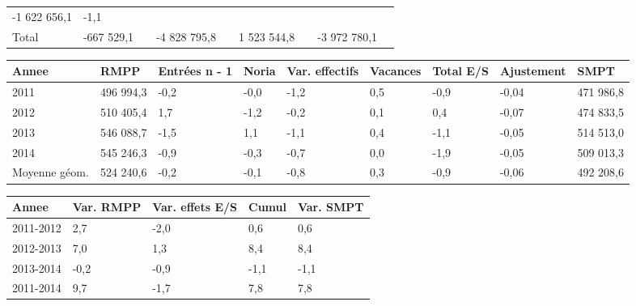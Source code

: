 \begin{longtable}[]{@{}lllllllll@{}}
\begin{minipage}[t]{0.10\columnwidth}
-1 622 656,1\strut
\end{minipage} & \begin{minipage}[t]{0.06\columnwidth}\raggedright
-1,1\strut
\end{minipage}\tabularnewline
\begin{minipage}[t]{0.05\columnwidth}\raggedright
Total\strut
\end{minipage} & \begin{minipage}[t]{0.10\columnwidth}\raggedright
-667 529,1\strut
\end{minipage} & \begin{minipage}[t]{0.06\columnwidth}\raggedright
\strut
\end{minipage} & \begin{minipage}[t]{0.16\columnwidth}\raggedright
-4 828 795,8\strut
\end{minipage} & \begin{minipage}[t]{0.06\columnwidth}\raggedright
\strut
\end{minipage} & \begin{minipage}[t]{0.12\columnwidth}\raggedright
1 523 544,8\strut
\end{minipage} & \begin{minipage}[t]{0.06\columnwidth}\raggedright
\strut
\end{minipage} & \begin{minipage}[t]{0.10\columnwidth}\raggedright
-3 972 780,1\strut
\end{minipage} & \begin{minipage}[t]{0.06\columnwidth}\raggedright
\strut
\end{minipage}\tabularnewline
\bottomrule
\end{longtable}

\begin{longtable}[]{@{}lllllllll@{}}
\toprule
Annee & RMPP & Entrées n - 1 & Noria & Var. effectifs & Vacances & Total
E/S & Ajustement & SMPT\tabularnewline
\midrule
\endhead
2011 & 496 994,3 & -0,2 & -0,0 & -1,2 & 0,5 & -0,9 & -0,04 & 471
986,8\tabularnewline
2012 & 510 405,4 & 1,7 & -1,2 & -0,2 & 0,1 & 0,4 & -0,07 & 474
833,5\tabularnewline
2013 & 546 088,7 & -1,5 & 1,1 & -1,1 & 0,4 & -1,1 & -0,05 & 514
513,0\tabularnewline
2014 & 545 246,3 & -0,9 & -0,3 & -0,7 & 0,0 & -1,9 & -0,05 & 509
013,3\tabularnewline
Moyenne géom. & 524 240,6 & -0,2 & -0,1 & -0,8 & 0,3 & -0,9 & -0,06 &
492 208,6\tabularnewline
\bottomrule
\end{longtable}

\begin{longtable}[]{@{}lllll@{}}
\toprule
Annee & Var. RMPP & Var. effets E/S & Cumul & Var. SMPT\tabularnewline
\midrule
\endhead
2011-2012 & 2,7 & -2,0 & 0,6 & 0,6\tabularnewline
2012-2013 & 7,0 & 1,3 & 8,4 & 8,4\tabularnewline
2013-2014 & -0,2 & -0,9 & -1,1 & -1,1\tabularnewline
2011-2014 & 9,7 & -1,7 & 7,8 & 7,8\tabularnewline
\bottomrule
\end{longtable}

